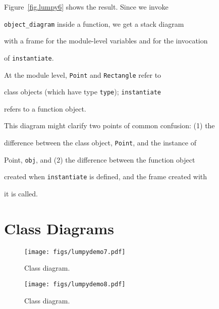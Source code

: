 Figure~\ref{fig.lumpy6} shows the result.  Since we invoke

\verb"object_diagram" inside a function, we get a stack diagram

with a frame for the module-level variables and for the invocation

of {\tt instantiate}.



At the module level, {\tt Point} and {\tt Rectangle} refer to

class objects (which have type {\tt type}); {\tt instantiate}

refers to a function object.





This diagram might clarify two points of common confusion: (1) the

difference between the class object, {\tt Point}, and the instance of

Point, {\tt obj}, and (2) the difference between the function object

created when {\tt instantiate} is defined, and the frame created with

it is called.





\section{Class Diagrams}



\begin{figure}

\centerline

{\texttt{[image: figs/lumpydemo7.pdf]}}

\caption{Class diagram.}

\label{fig.lumpy7}

\end{figure}



\begin{figure}

\centerline

{\texttt{[image: figs/lumpydemo8.pdf]}}

\caption{Class diagram.}

\label{fig.lumpy8}

\end{figure}



